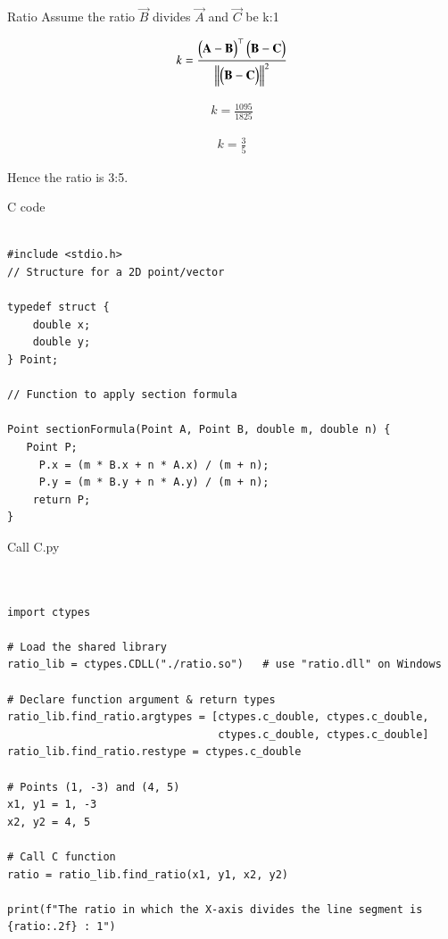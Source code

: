 \documentclass{beamer}
\begin{document}
\begin{frame}{Ratio}
Assume the ratio $\vec{B}$ divides $\vec{A}$  and $\vec{C}$ be k:1

\begin{align}
    k = \frac{\begin{pmatrix}\mathbf{A} - \mathbf{B}\end{pmatrix}^\top \begin{pmatrix}\mathbf{B} - \mathbf{C}\end{pmatrix}}{\left\lVert\begin{pmatrix}\mathbf{B} - \mathbf{C}\end{pmatrix}\right\rVert^2}
\end{align}

\begin{align}
    k = \frac{1095}{1825}
\end{align}

\begin{align}
    k = \frac{3}{5}
\end{align}

\centering
\begin{large}Hence the ratio is 3:5.\end{large}

\end{frame}

\begin{frame}[fragile]{C code}
\begin{lstlisting}

#include <stdio.h>
// Structure for a 2D point/vector

typedef struct {
    double x;
    double y;
} Point;

// Function to apply section formula

Point sectionFormula(Point A, Point B, double m, double n) {
   Point P;
     P.x = (m * B.x + n * A.x) / (m + n);
     P.y = (m * B.y + n * A.y) / (m + n);
    return P;
}
\end{lstlisting}
\end{frame}

\begin{frame}[fragile]{Call C.py}
\begin{lstlisting}
    

import ctypes

# Load the shared library
ratio_lib = ctypes.CDLL("./ratio.so")   # use "ratio.dll" on Windows

# Declare function argument & return types
ratio_lib.find_ratio.argtypes = [ctypes.c_double, ctypes.c_double,
                                 ctypes.c_double, ctypes.c_double]
ratio_lib.find_ratio.restype = ctypes.c_double

# Points (1, -3) and (4, 5)
x1, y1 = 1, -3
x2, y2 = 4, 5

# Call C function
ratio = ratio_lib.find_ratio(x1, y1, x2, y2)

print(f"The ratio in which the X-axis divides the line segment is {ratio:.2f} : 1")
\end{lstlisting}
\end{frame}
\end{document}
